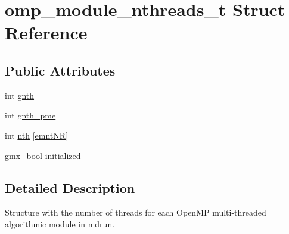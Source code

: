 \hypertarget{structomp__module__nthreads__t}{\section{omp\-\_\-module\-\_\-nthreads\-\_\-t \-Struct \-Reference}
\label{structomp__module__nthreads__t}
}
\subsection*{\-Public \-Attributes}
\begin{DoxyCompactItemize}
\item 
int \hyperlink{structomp__module__nthreads__t_a74584a24b817803878e0e046ff1fb327}{gnth}
\item 
int \hyperlink{structomp__module__nthreads__t_a84a7847560c9b6b7d7ce57935e587f1e}{gnth\-\_\-pme}
\item 
int \hyperlink{structomp__module__nthreads__t_aac0022d490268302b55434c9ea349020}{nth} \mbox{[}\hyperlink{share_2template_2gromacs_2gmx__omp__nthreads_8h_a979a21ff2aa8f71045dbd8e43a339fa6af2d5bb3ba055fe12ede8f63937fd4a34}{emnt\-N\-R}\mbox{]}
\item 
\hyperlink{include_2types_2simple_8h_a8fddad319f226e856400d190198d5151}{gmx\-\_\-bool} \hyperlink{structomp__module__nthreads__t_ab6b5039c1fc33a807163a1c345ada755}{initialized}
\end{DoxyCompactItemize}


\subsection{\-Detailed \-Description}
\-Structure with the number of threads for each \-Open\-M\-P multi-\/threaded algorithmic module in mdrun. 

